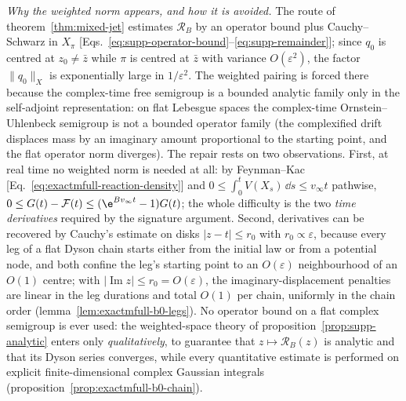 \emph{Why the weighted norm appears, and how it is avoided.}
The route of theorem~\ref{thm:mixed-jet} estimates \(\mathcal R_B\) by an
operator bound plus Cauchy--Schwarz in \(X_\pi\)
[Eqs.~\eqref{eq:supp-operator-bound}--\eqref{eq:supp-remainder}]; since
\(q_0\) is centred at \(z_0\ne\bar z\) while \(\pi\) is centred at \(\bar z\)
with variance \(O(\varepsilon^2)\), the factor \(\|q_0\|_X\) is
exponentially large in \(1/\varepsilon^2\).  The weighted pairing is forced
there because the complex-time free semigroup is a bounded analytic family
only in the self-adjoint representation: on flat Lebesgue spaces the
complex-time Ornstein--Uhlenbeck semigroup is not a bounded operator family
(the complexified drift displaces mass by an imaginary amount proportional
to the starting point, and the flat operator norm diverges).  The repair
rests on two observations.  First, at real time no weighted norm is needed
at all: by Feynman--Kac [Eq.~\eqref{eq:exactmfull-reaction-density}] and
\(0\le\int_0^tV(X_s)\,\dd s\le v_\infty t\) pathwise,
\(0\le G(t)-\mathcal F(t)\le(\e^{Bv_\infty t}-1)G(t)\); the whole difficulty
is the two \emph{time derivatives} required by the signature argument.
Second, derivatives can be recovered by Cauchy's estimate on disks
\(|z-t|\le r_0\) with \(r_0\propto\varepsilon\), because every leg of a flat
Dyson chain starts either from the initial law or from a potential node,
and both confine the leg's starting point to an \(O(\varepsilon)\)
neighbourhood of an \(O(1)\) centre; with \(|\operatorname{Im}z|\le
r_0=O(\varepsilon)\), the imaginary-displacement penalties are linear in the
leg durations and total \(O(1)\) per chain, uniformly in the chain order
(lemma~\ref{lem:exactmfull-b0-legs}).  No operator bound on a flat complex
semigroup is ever used: the weighted-space theory of
proposition~\ref{prop:supp-analytic} enters only \emph{qualitatively}, to
guarantee that \(z\mapsto\mathcal R_B(z)\) is analytic and that its Dyson
series converges, while every quantitative estimate is performed on
explicit finite-dimensional complex Gaussian integrals
(proposition~\ref{prop:exactmfull-b0-chain}).

